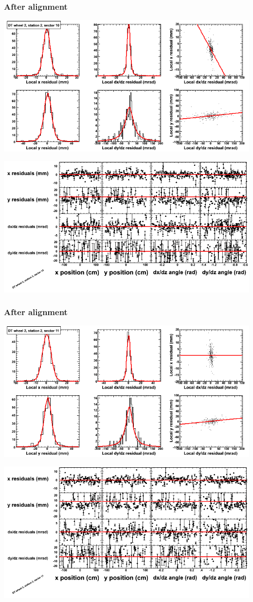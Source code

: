 \documentclass[compress]{beamer}
\begin{document}
\begin{frame}
\frametitle{After alignment}
\includegraphics[width=0.7\linewidth]{NOV4_fitfunctions/MBwhEst2sec10_bellcurves.png}

\includegraphics[width=0.7\linewidth]{NOV4_fitfunctions/MBwhEst2sec10_polynomials.png}
\end{frame}

\begin{frame}
\frametitle{After alignment}
\includegraphics[width=0.7\linewidth]{NOV4_fitfunctions/MBwhEst2sec11_bellcurves.png}

\includegraphics[width=0.7\linewidth]{NOV4_fitfunctions/MBwhEst2sec11_polynomials.png}
\end{frame}
\end{document}

